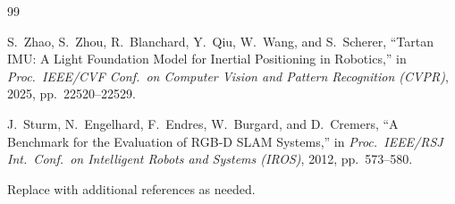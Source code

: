 \documentclass[letterpaper,10pt,conference]{ieeeconf}
\begin{document}
\begin{thebibliography}{99}

S.~Zhao, S.~Zhou, R.~Blanchard, Y.~Qiu, W.~Wang, and S.~Scherer,
``Tartan IMU: A Light Foundation Model for Inertial Positioning in Robotics,''
in \emph{Proc.\ IEEE/CVF Conf.\ on Computer Vision and Pattern Recognition
(CVPR)}, 2025, pp.~22520--22529.

J.~Sturm, N.~Engelhard, F.~Endres, W.~Burgard, and D.~Cremers,
``A Benchmark for the Evaluation of RGB-D SLAM Systems,''
in \emph{Proc.\ IEEE/RSJ Int.\ Conf.\ on Intelligent Robots and Systems (IROS)}, 2012,
pp.~573--580.

Replace with additional references as needed.

\end{thebibliography}
\end{document}
